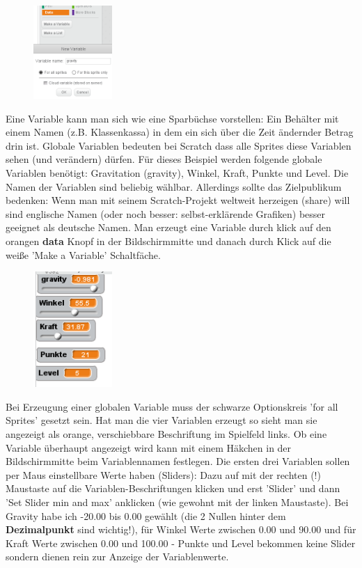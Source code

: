 \begin{figure}
\includegraphics[width=3cm]{scratch/makevar.png}
\end{figure}
Eine Variable kann man sich wie eine Sparbüchse vorstellen: Ein Behälter mit einem Namen (z.B. Klassenkassa) in dem ein sich über die Zeit ändernder Betrag drin ist. Globale Variablen bedeuten bei Scratch dass alle Sprites diese Variablen sehen (und verändern) dürfen. Für dieses Beispiel werden folgende globale Variablen benötigt: Gravitation (gravity), Winkel, Kraft, Punkte und Level. Die Namen der Variablen sind beliebig wählbar. Allerdings sollte das Zielpublikum bedenken: Wenn man mit seinem Scratch-Projekt weltweit herzeigen (share) will sind englische Namen (oder noch besser: selbst-erklärende Grafiken) besser geeignet als deutsche Namen. Man erzeugt eine Variable durch klick auf den orangen \textbf{data} Knopf in der Bildschirmmitte und danach durch Klick auf die weiße 'Make a Variable' Schaltfäche.


\begin{figure}
\includegraphics[width=3cm]{scratch/fsliders.png}
\end{figure}
Bei Erzeugung einer globalen Variable muss der schwarze Optionskreis 'for all Sprites' gesetzt sein. Hat man die vier Variablen erzeugt so sieht man sie angezeigt als
orange, verschiebbare Beschriftung im Spielfeld links. Ob eine Variable überhaupt angezeigt wird kann mit einem Häkchen in der Bildschirmmitte beim Variablennamen festlegen. Die ersten drei Variablen sollen per Maus einstellbare Werte haben (Sliders): Dazu auf mit der rechten (!) Maustaste auf die Variablen-Beschriftungen klicken und erst 'Slider' und dann 'Set Slider min and max' anklicken (wie gewohnt mit der linken Maustaste). Bei Gravity habe ich -20.00 bis 0.00 gewählt (die 2 Nullen hinter dem \textbf{Dezimalpunkt} sind wichtig!), für Winkel Werte zwischen 0.00 und 90.00 und für Kraft Werte zwischen 0.00 und 100.00 - Punkte und Level bekommen keine Slider sondern dienen rein zur Anzeige der Variablenwerte.




